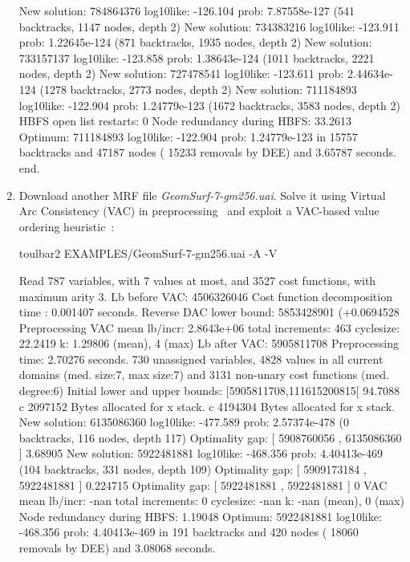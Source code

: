 \begin{enumerate}
{\begin{DoxyCode}
New solution: 784864376 log10like: -126.104 prob: 7.87558e-127 (541 backtracks, 1147 nodes, depth 2)
New solution: 734383216 log10like: -123.911 prob: 1.22645e-124 (871 backtracks, 1935 nodes, depth 2)
New solution: 733157137 log10like: -123.858 prob: 1.38643e-124 (1011 backtracks, 2221 nodes, depth 2)
New solution: 727478541 log10like: -123.611 prob: 2.44634e-124 (1278 backtracks, 2773 nodes, depth 2)
New solution: 711184893 log10like: -122.904 prob: 1.24779e-123 (1672 backtracks, 3583 nodes, depth 2)
HBFS open list restarts: 0 %
Node redundancy during HBFS: 33.2613 %
Optimum: 711184893 log10like: -122.904 prob: 1.24779e-123 in 15757 backtracks and 47187 nodes ( 15233 removals by DEE) and 3.65787 seconds.
end.
\end{DoxyCode}}
\item Download another MRF file {\em GeomSurf-7-gm256.uai}. Solve it using Virtual Arc Consistency (VAC) in preprocessing~\cite{Cooper08} and exploit a VAC-based value ordering heuristic~\cite{Cooper10a}:
\begin{DoxyCode}
	toulbar2 EXAMPLES/GeomSurf-7-gm256.uai -A -V
\end{DoxyCode}
{\scriptsize
\begin{DoxyCode}
Read 787 variables, with 7 values at most, and 3527 cost functions, with maximum arity 3.
Lb before VAC: 4506326046
Cost function decomposition time : 0.001407 seconds.
Reverse DAC lower bound: 5853428901 (+0.0694528%
Preprocessing VAC mean lb/incr: 2.8643e+06     total increments: 463     cyclesize: 22.2419     k: 1.29806 (mean), 4 (max)
Lb after VAC: 5905811708
Preprocessing time: 2.70276 seconds.
730 unassigned variables, 4828 values in all current domains (med. size:7, max size:7) and 3131 non-unary cost functions (med. degree:6)
Initial lower and upper bounds: [5905811708,111615200815[ 94.7088%
c 2097152 Bytes allocated for x stack.
c 4194304 Bytes allocated for x stack.
New solution: 6135086360 log10like: -477.589 prob: 2.57374e-478 (0 backtracks, 116 nodes, depth 117)
Optimality gap: [ 5908760056 , 6135086360 ] 3.68905 %
New solution: 5922481881 log10like: -468.356 prob: 4.40413e-469 (104 backtracks, 331 nodes, depth 109)
Optimality gap: [ 5909173184 , 5922481881 ] 0.224715 %
Optimality gap: [ 5922481881 , 5922481881 ] 0 %
VAC mean lb/incr: -nan     total increments: 0     cyclesize: -nan     k: -nan (mean), 0 (max)
Node redundancy during HBFS: 1.19048 %
Optimum: 5922481881 log10like: -468.356 prob: 4.40413e-469 in 191 backtracks and 420 nodes ( 18060 removals by DEE) and 3.08068 seconds.

\end{DoxyCode}}
\end{enumerate}

